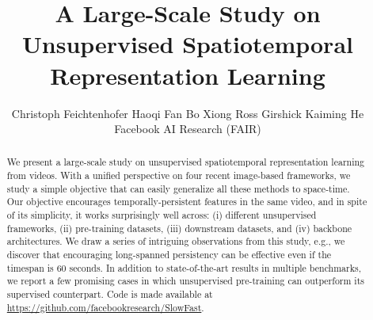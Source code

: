 \documentclass[final]{cvpr}
\begin{document}
	
	\title{ A Large-Scale Study on Unsupervised Spatiotemporal Representation Learning\\ }

	\author{
		Christoph Feichtenhofer \qquad
		Haoqi Fan \qquad
		Bo Xiong \qquad
		Ross Girshick  \qquad
		Kaiming He \vspace{.8em}\\
		Facebook AI Research (FAIR)
	}
	
	\maketitle
	
	\newcommand{\fastcolor}[1]{\textcolor{fastcolor}{\textbf{#1}}}
	\newcommand{\fastcolorC}[1]{\textcolor{orange}{#1}}
	\newcommand{\slowcolor}[1]{\textcolor{slowcolor}{#1}}
	
	\newcommand{\slow}{\slowcolor{Slow }}
	\newcommand{\fast}{\fastcolor{Fast }}
	
	\newcommand{\predictioncolor}[1]{\textcolor{predictioncolor}{#1}}
	\newcommand{\labelcolor}[1]{\textcolor{labelcolor}{#1}}
	
	\newcommand{\pred}{\predictioncolor{\textbf{Predictions}: }}
	\newcommand{\gt}{\labelcolor{\textbf{Labels}: }}
	
	
	\newcommand{\demph}[1]{\textcolor{demphcolor}{#1}}
	
	
	\begin{abstract}
		We present a large-scale study on unsupervised spatiotemporal representation learning from videos. With a unified perspective on four recent image-based frameworks, we study a simple objective that can easily generalize all these methods to space-time. Our objective encourages temporally-persistent features in the same video, and in spite of its simplicity, it works surprisingly well across: (i) different unsupervised frameworks, (ii) pre-training datasets, (iii) downstream datasets, and (iv) backbone architectures. We draw a series of intriguing observations from this study, e.g., we discover that encouraging long-spanned persistency can be effective even if the timespan is 60 seconds. In addition to state-of-the-art results in multiple benchmarks, we report a few promising cases in which unsupervised pre-training can outperform its supervised counterpart. Code is made available at  \url{https://github.com/facebookresearch/SlowFast}.
	\end{abstract}
\end{document}
